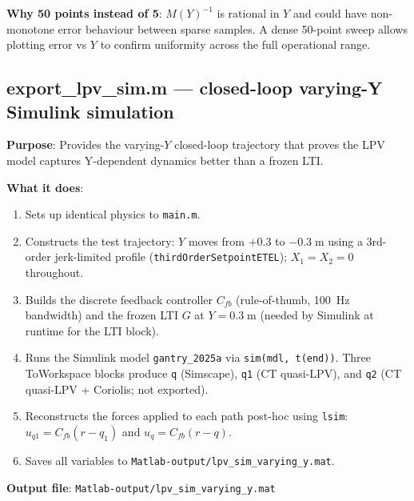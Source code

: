 \documentclass[11pt,a4paper]{article}
\newcommand{\inv}{^{-1}}
\begin{document}
\textbf{Why 50 points instead of 5}: $M(Y)\inv$ is rational in $Y$ and could have
non-monotone error behaviour between sparse samples. A dense 50-point sweep allows plotting
error vs $Y$ to confirm uniformity across the full operational range.

\subsection{export\_lpv\_sim.m --- closed-loop varying-Y Simulink simulation}
\label{sec:export_sim}

\textbf{Purpose}: Provides the varying-$Y$ closed-loop trajectory that proves the LPV model
captures Y-dependent dynamics better than a frozen LTI.

\textbf{What it does}:
\begin{enumerate}[nosep]
\item Sets up identical physics to \texttt{main.m}.
\item Constructs the test trajectory: $Y$ moves from $+0.3$ to $-0.3\;\text{m}$ using a
  3rd-order jerk-limited profile (\texttt{thirdOrderSetpointETEL}); $X_1 = X_2 = 0$
  throughout.
\item Builds the discrete feedback controller $C_{fb}$ (rule-of-thumb, 100~Hz bandwidth) and
  the frozen LTI $G$ at $Y = 0.3\;\text{m}$ (needed by Simulink at runtime for the LTI
  block).
\item Runs the Simulink model \texttt{gantry\_2025a} via \texttt{sim(mdl, t(end))}.
  Three ToWorkspace blocks produce \texttt{q} (Simscape), \texttt{q1} (CT quasi-LPV), and
  \texttt{q2} (CT quasi-LPV + Coriolis; not exported).
\item Reconstructs the forces applied to each path post-hoc using \texttt{lsim}:
  $u_{q1} = C_{fb}(r - q_1)$ and $u_q = C_{fb}(r - q)$.
\item Saves all variables to \texttt{Matlab-output/lpv\_sim\_varying\_y.mat}.
\end{enumerate}

\textbf{Output file}: \texttt{Matlab-output/lpv\_sim\_varying\_y.mat}
\end{document}
